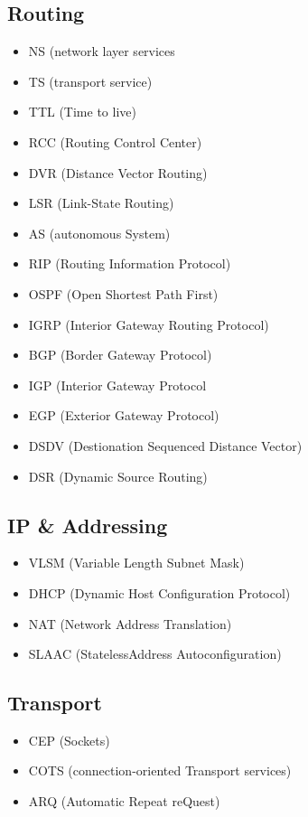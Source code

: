 	\subsection{Routing}
		\begin{itemize}
			\item NS (network layer services
			\item TS (transport service)
			\item TTL (Time to live)
			\item RCC (Routing Control Center)
			\item DVR (Distance Vector Routing)
			\item LSR (Link-State Routing)
			\item AS (autonomous System)
			\item RIP (Routing Information Protocol)
			\item OSPF (Open Shortest Path First)
			\item IGRP (Interior Gateway Routing Protocol)
			\item BGP (Border Gateway Protocol)
			\item IGP (Interior Gateway Protocol
			\item EGP (Exterior Gateway Protocol)
			\item DSDV (Destionation Sequenced Distance Vector)
			\item DSR (Dynamic Source Routing)
		\end{itemize}
	\subsection{IP \& Addressing}
		\begin{itemize}
			\item VLSM (Variable Length Subnet Mask)
			\item DHCP (Dynamic Host Configuration Protocol)
			\item NAT (Network Address Translation)
			\item SLAAC (StatelessAddress Autoconfiguration)
		\end{itemize}
	\subsection{Transport}
		\begin{itemize}
			\item CEP (Sockets)
			\item COTS (connection-oriented Transport services)
			\item ARQ (Automatic Repeat reQuest)
		\end{itemize}